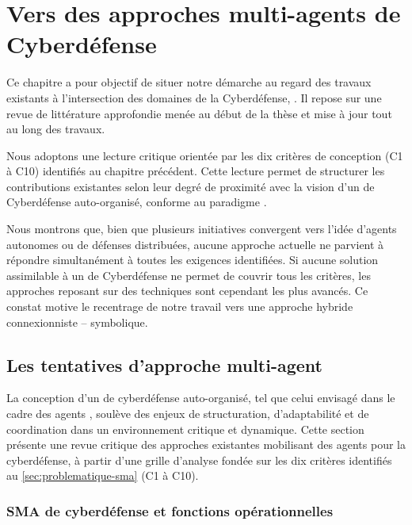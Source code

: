 \chapter{Vers des approches multi-agents de Cyberdéfense}

% 

\noindent
Ce chapitre a pour objectif de situer notre démarche au regard des travaux existants à l'intersection des domaines de la Cyberdéfense, . Il repose sur une revue de littérature approfondie menée au début de la thèse et mise à jour tout au long des travaux.

Nous adoptons une lecture critique orientée par les dix critères de conception (C1 à C10) identifiés au chapitre précédent. Cette lecture permet de structurer les contributions existantes selon leur degré de proximité avec la vision d'un  de Cyberdéfense auto-organisé, conforme au paradigme .

Nous montrons que, bien que plusieurs initiatives convergent vers l'idée d'agents autonomes ou de défenses distribuées, aucune approche actuelle ne parvient à répondre simultanément à toutes les exigences identifiées.
Si aucune solution assimilable à un  de Cyberdéfense ne permet de couvrir tous les critères, les approches reposant sur des techniques  sont cependant les plus avancés.
Ce constat motive le recentrage de notre travail vers une approche hybride connexionniste --  symbolique.

\section{Les tentatives d'approche multi-agent}\label{sec:sma-conception}


La conception d'un  de cyberdéfense auto-organisé, tel que celui envisagé dans le cadre des agents , soulève des enjeux de structuration, d'adaptabilité et de coordination dans un environnement critique et dynamique. Cette section présente une revue critique des approches existantes mobilisant des agents pour la cyberdéfense, à partir d'une grille d'analyse fondée sur les dix critères identifiés au \autoref{sec:problematique-sma} (C1 à C10).

\subsection*{SMA de cyberdéfense et fonctions opérationnelles}

